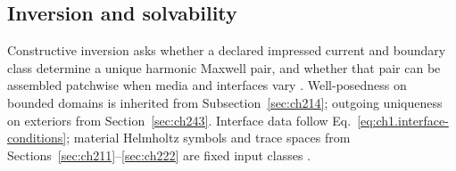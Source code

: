 \subsection{Inversion and solvability}
\label{sec:ch234}

Constructive inversion asks whether a declared impressed current and boundary class determine a
unique harmonic Maxwell pair, and whether that pair can be assembled patchwise when media and
interfaces vary \cite{stratton1941}. Well-posedness on bounded domains is inherited from
Subsection~\ref{sec:ch214}; outgoing uniqueness on exteriors from Section~\ref{sec:ch243}.
Interface data follow Eq.~\eqref{eq:ch1.interface-conditions}; material Helmholtz symbols and
trace spaces from Sections~\ref{sec:ch211}--\ref{sec:ch222} are fixed input classes
\cite{stratton1941}.

